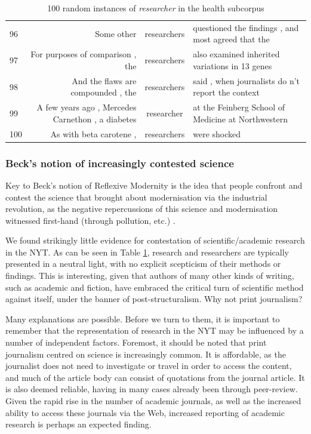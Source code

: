{\begin{table}
\begin{tabular}{|lrcl|}
96 &  Some other                                         & researchers & questioned the findings , and most agreed that the \\
97 &  For purposes of comparison , the                   & researchers & also examined inherited variations in 13 genes     \\
98 &  And the flaws are compounded , the                 & researchers & said , when journalists do n't report the context  \\
99 &  A few years ago , Mercedes Carnethon , a diabetes  & researcher  & at the Feinberg School of Medicine at Northwestern \\
100 &  As with beta carotene ,                            & researchers & were shocked                                       \\
\hline
\end{tabular}
\caption{100 random instances of \emph{researcher} in the health subcorpus}
\label{tab:researcher}
\end{table}
\clearpage
}

\subsubsection{Beck's notion of increasingly contested science}

Key to Beck's notion of Reflexive Modernity is the idea that people confront and contest the science that brought about modernisation via the industrial revolution, as the negative repercussions of this science and modernisation witnessed first-hand (through pollution, etc.) \cite{ross_science_1996}. 

We found strikingly little evidence for contestation of scientific\slash academic research in the NYT. As can be seen in Table \ref{tab:researcher}, research and researchers are typically presented in a neutral light, with no explicit scepticism of their methods or findings. This is interesting, given that authors of many other kinds of writing, such as academic and fiction, have embraced the critical turn of scientific method against itself, under the banner of post-structuralism. Why not print journalism?

Many explanations are possible. Before we turn to them, it is important to remember that the representation of research in the NYT may be influenced by a number of independent factors. Foremost, it should be noted that print journalism centred on science is increasingly common. It is affordable, as the journalist does not need to investigate or travel in order to access the content, and much of the article body can consist of quotations from the journal article. It is also deemed reliable, having in many cases already been through peer-review. Given the rapid rise in the number of academic journals, as well as the increased ability to access these journals via the Web, increased reporting of academic research is perhaps an expected finding. 

